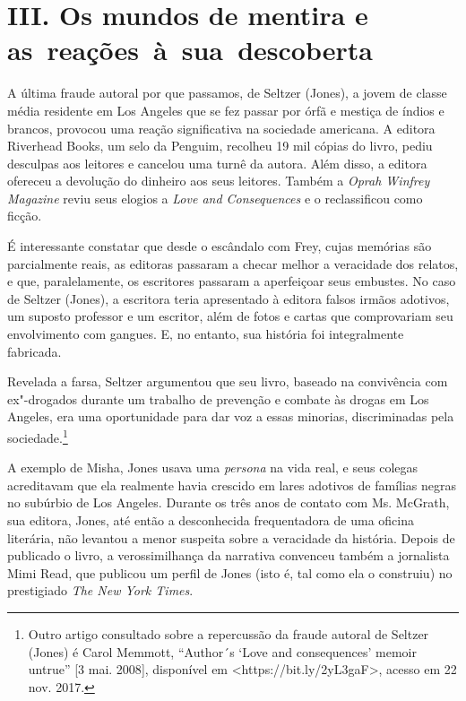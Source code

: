 \section*{III. Os mundos de mentira e as~reações~à~sua~descoberta}

A última fraude autoral por que passamos, de Seltzer (Jones), a jovem de
classe média residente em Los Angeles que se fez passar por órfã e
mestiça de índios e brancos, provocou uma reação significativa na
sociedade americana. A editora Riverhead Books, um selo da Penguim,
recolheu 19 mil cópias do livro, pediu desculpas aos leitores e cancelou
uma turnê da autora. Além disso, a editora ofereceu a devolução do
dinheiro aos seus leitores. Também a \emph{Oprah Winfrey Magazine} reviu
seus elogios a \emph{Love and Consequences} e o reclassificou como
ficção.

É interessante constatar que desde o escândalo com Frey, cujas memórias
são parcialmente reais, as editoras passaram a checar melhor a
veracidade dos relatos, e que, paralelamente, os escritores passaram a
aperfeiçoar seus embustes. No caso de Seltzer (Jones), a escritora teria
apresentado à editora falsos irmãos adotivos, um suposto professor e um
escritor, além de fotos e cartas que comprovariam seu envolvimento com
gangues. E, no entanto, sua história foi integralmente fabricada.

Revelada a farsa, Seltzer argumentou que seu livro, baseado na
convivência com ex"-drogados durante um trabalho de prevenção e combate
às drogas em Los Angeles, era uma oportunidade para dar voz a essas
minorias, discriminadas pela sociedade.\footnote{Outro artigo consultado
  sobre a repercussão da fraude autoral de Seltzer (Jones) é Carol
  Memmott, ``Author´s `Love and consequences' memoir untrue'' {[}3 mai.
  2008{]}, disponível em \textless{}https://bit.ly/2yL3gaF\textgreater{}, acesso em 22 nov. 2017.}

A exemplo de Misha, Jones usava uma \emph{persona} na vida real, e seus
colegas acreditavam que ela realmente havia crescido em lares adotivos
de famílias negras no subúrbio de Los Angeles. Durante os três anos de
contato com Ms. McGrath, sua editora, Jones, até então a desconhecida
frequentadora de uma oficina literária, não levantou a menor suspeita
sobre a veracidade da história. Depois de publicado o livro, a
verossimilhança da narrativa convenceu também a jornalista Mimi Read,
que publicou um perfil de Jones (isto é, tal como ela o construiu) no
prestigiado \emph{The New York Times}.

